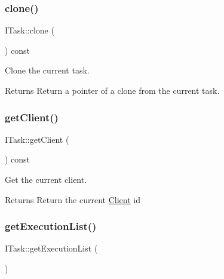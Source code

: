 \subsubsection{\texorpdfstring{clone()}{clone()}}
{\footnotesize\ttfamily I\+Task\+::clone (\begin{DoxyParamCaption}{ }\end{DoxyParamCaption}) const\hspace{0.3cm}{\ttfamily [pure virtual]}}



Clone the current task. 

\begin{DoxyReturn}{Returns}
Return a pointer of a clone from the current task. 
\end{DoxyReturn}
\mbox{\label{classxzia_1_1ITask_a2fa35ad0ca8d373c4efd6e928755b5e7}} 
\subsubsection{\texorpdfstring{get\+Client()}{getClient()}}
{\footnotesize\ttfamily I\+Task\+::get\+Client (\begin{DoxyParamCaption}{ }\end{DoxyParamCaption}) const\hspace{0.3cm}{\ttfamily [pure virtual]}}



Get the current client. 

\begin{DoxyReturn}{Returns}
Return the current \mbox{\hyperlink{structClient}{Client}} id 
\end{DoxyReturn}
\mbox{\label{classxzia_1_1ITask_a100285f59380ad90225231734c9a29ab}} 
\subsubsection{\texorpdfstring{get\+Execution\+List()}{getExecutionList()}}
{\footnotesize\ttfamily I\+Task\+::get\+Execution\+List (\begin{DoxyParamCaption}{ }\end{DoxyParamCaption})\hspace{0.3cm}{\ttfamily [pure virtual]}}



